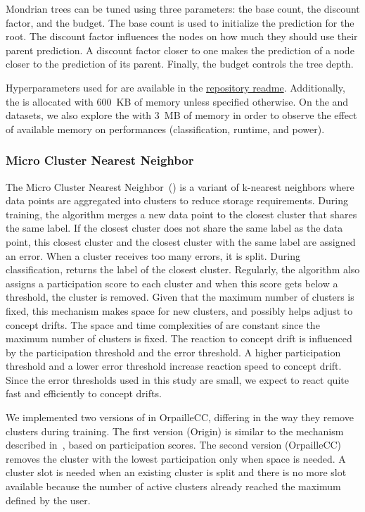 Mondrian trees can be tuned using three parameters: the base count, the discount
factor, and the budget. The base count is used to initialize the prediction for
the root. The discount factor influences the nodes on how much they should use
their parent prediction. A discount factor closer to one makes the prediction of
a node closer to the prediction of its parent.  Finally, the budget controls the
tree depth.

Hyperparameters used for \mondrianforest are available in the
\href{https://github.com/azazel7/paper-benchmark/blob/master/README.md}{repository
readme}.  Additionally, the \mondrianforest is allocated with 600~KB of memory
unless specified otherwise.  On the \banosdataset and \recofitdataset datasets,
we also explore the \mondrianforest with 3~MB of memory in order to observe the
effect of available memory on performances (classification, runtime, and power).

\subsubsection{Micro Cluster Nearest Neighbor~\cite{mc-nn}}
The Micro Cluster Nearest Neighbor~(\mcnn) is a variant of k-nearest neighbors
where data points are aggregated into clusters to reduce storage requirements.
During training, the algorithm merges a new data point to the closest cluster
that shares the same label. If the closest cluster does not share the same label
as the data point, this closest cluster and the closest cluster with the same
label are assigned an error. When a cluster receives too many errors, it is
split. During classification, \mcnn returns the label of the closest cluster.
Regularly, the algorithm also assigns a participation score to each cluster and
when this score gets below a threshold, the cluster is removed.  Given that the
maximum number of clusters is fixed, this mechanism makes space for new
clusters, and possibly helps adjust to concept drifts.  The space and time
complexities of \mcnn are constant since the maximum number of clusters is
fixed.  The reaction to concept drift is influenced by the participation
threshold and the error threshold.  A higher participation threshold and a lower
error threshold increase reaction speed to concept drift. Since the error
thresholds used in this study are small, we expect \mcnn to react quite fast and
efficiently to concept drifts.

We implemented two versions of \mcnn in OrpailleCC, differing in the way they
remove clusters during training. The first version (\mcnn Origin) is similar to
the mechanism described in~\cite{mc-nn}, based on participation scores.  The
second version (\mcnn OrpailleCC) removes the cluster with the lowest
participation only when space is needed.  A cluster slot is needed when an
existing cluster is split and there is no more slot available because the number
of active clusters already reached the maximum defined by the user.

